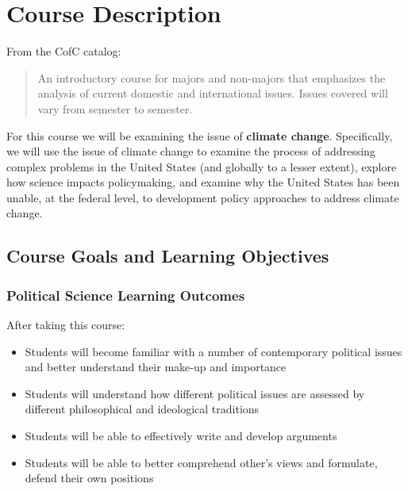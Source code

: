 \hypertarget{course-description}{%
\section{Course Description}\label{course-description}}

From the CofC catalog:

\begin{quote}
An introductory course for majors and non-majors that emphasizes the
analysis of current domestic and international issues. Issues covered
will vary from semester to semester.
\end{quote}

\noindent For this course we will be examining the issue of
\textbf{climate change}. Specifically, we will use the issue of climate
change to examine the process of addressing complex problems in the
United States (and globally to a lesser extent), explore how science
impacts policymaking, and examine why the United States has been unable,
at the federal level, to development policy approaches to address
climate change.

\hypertarget{course-goals-and-learning-objectives}{%
\subsection{Course Goals and Learning
Objectives}\label{course-goals-and-learning-objectives}}

\hypertarget{political-science-learning-outcomes}{%
\subsubsection{Political Science Learning
Outcomes}\label{political-science-learning-outcomes}}

After taking this course:

\begin{itemize}
\item
  Students will become familiar with a number of contemporary political
  issues and better understand their make‐up and importance
\item
  Students will understand how different political issues are assessed
  by different philosophical and ideological traditions
\item
  Students will be able to effectively write and develop arguments
\item
  Students will be able to better comprehend other's views and
  formulate, defend their own positions
\end{itemize}

